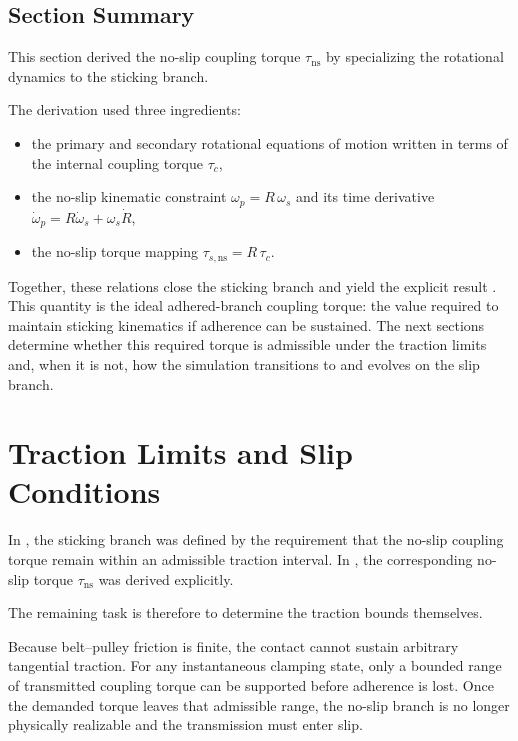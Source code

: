 \documentclass[11pt]{article}
\numberwithin{equation}{section}
\begin{document}
\subsection{Section Summary}

This section derived the no-slip coupling torque $\tau_{\mathrm{ns}}$ by
specializing the rotational dynamics to the sticking branch.

The derivation used three ingredients:

\begin{itemize}
    \item the primary and secondary rotational equations of motion written in
          terms of the internal coupling torque $\tau_c$,
    \item the no-slip kinematic constraint
          $\omega_p=R\,\omega_s$ and its time derivative
          $\dot{\omega}_p=R\dot{\omega}_s+\omega_s\dot R$,
    \item the no-slip torque mapping
          $\tau_{s,\mathrm{ns}}=R\,\tau_c$.
\end{itemize}

Together, these relations close the sticking branch and yield the explicit
result . This quantity is the ideal adhered-branch
coupling torque: the value required to maintain sticking kinematics if
adherence can be sustained. The next sections determine whether this required
torque is admissible under the traction limits and, when it is not, how the
simulation transitions to and evolves on the slip branch.


\section{Traction Limits and Slip Conditions}
\label{sec:traction-slip}

In , the sticking branch was defined by the
requirement that the no-slip coupling torque remain within an admissible
traction interval. In , the corresponding no-slip torque
$\tau_{\mathrm{ns}}$ was derived explicitly.

The remaining task is therefore to determine the traction bounds themselves.

Because belt--pulley friction is finite, the contact cannot sustain arbitrary
tangential traction.
For any instantaneous clamping state, only a bounded range of transmitted
coupling torque can be supported before adherence is lost.
Once the demanded torque leaves that admissible range, the no-slip branch is no
longer physically realizable and the transmission must enter slip.
\end{document}
